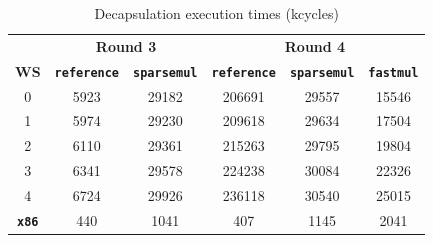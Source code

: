 \begin{table}[H]
    \centering
    \caption{Decapsulation execution times (kcycles)}
    \begin{tabular}{c|cc|ccc}
        \toprule
        & \multicolumn{2}{c|}{\textbf{Round 3}} & \multicolumn{3}{c}{\textbf{Round 4}} \\
        \textbf{WS} & \texttt{\textbf{reference}} & \texttt{\textbf{sparsemul}} & \texttt{\textbf{reference}} & \texttt{\textbf{sparsemul}} & \texttt{\textbf{fastmul}} \\
        \midrule
        0 & 5923 & 29182 & 206691 & 29557 & 15546 \\
        1 & 5974 & 29230 & 209618 & 29634 & 17504 \\
        2 & 6110 & 29361 & 215263 & 29795 & 19804 \\
        3 & 6341 & 29578 & 224238 & 30084 & 22326 \\
        4 & 6724 & 29926 & 236118 & 30540 & 25015 \\
        \midrule
        \textbf{\texttt{x86}} & 440 & 1041 & 407 & 1145 & 2041 \\
        \bottomrule
    \end{tabular}
    \label{tab:decapsTiming}
\end{table}

